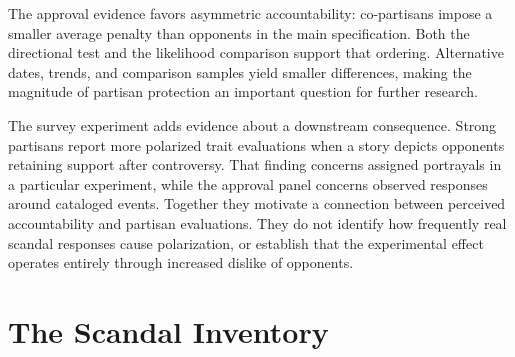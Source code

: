 \documentclass[11pt]{article}
\newcommand{\TableStyle}{\small\setlength{\tabcolsep}{5pt}\renewcommand{\arraystretch}{1.12}}
\begin{document}
The approval evidence favors asymmetric accountability: co-partisans impose a smaller average penalty than opponents in the main specification. Both the directional test and the likelihood comparison support that ordering. Alternative dates, trends, and comparison samples yield smaller differences, making the magnitude of partisan protection an important question for further research.

The survey experiment adds evidence about a downstream consequence. Strong partisans report more polarized trait evaluations when a story depicts opponents retaining support after controversy. That finding concerns assigned portrayals in a particular experiment, while the approval panel concerns observed responses around cataloged events. Together they motivate a connection between perceived accountability and partisan evaluations. They do not identify how frequently real scandal responses cause polarization, or establish that the experimental effect operates entirely through increased dislike of opponents.

\FloatBarrier
\begingroup
\small
{}


\endgroup
\clearpage
\appendix
\section{The Scandal Inventory}

\begin{table}[htbp]
\centering\TableStyle
\caption{Recorded categories and the main analysis}
\label{tab:inventory}

\caption*{Coding rows retain the original categories. Several rows can describe the same episode. Main events count the first cataloged event for each retained official; a first row supplies its category. Clean and incomplete rows are excluded from the category counts.}
\end{table}

\begin{table}[htbp]
\centering\TableStyle
\caption{Polling support for dated catalog keys}

\caption*{Counts apply the main twelve-month window, event-month omission, next-event censoring, comparable party definitions, and event-party match. The catalog includes one incomplete Rubio key lacking state and office; it falls in the no-match category. Missing post-event support need not imply resignation or defeat.}
\end{table}
\FloatBarrier
\end{document}
